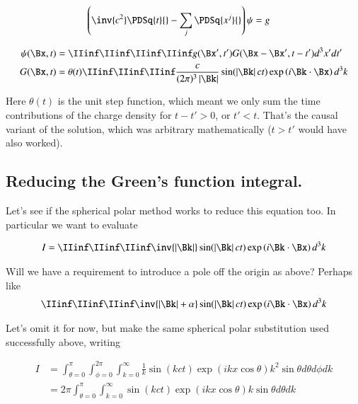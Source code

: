 \begin{align}
\left( \inv{c^2} \PDSq{t}{} -\sum_j \PDSq{x^j}{} \right)\psi &= g
\end{align}

\begin{align}
{\psi}(\Bx, t) &= \IIinf \IIinf \IIinf \IIinf g(\Bx', t') G(\Bx - \Bx', t - t') d^3 x' dt' \\
G(\Bx, t) &= \theta(t) \IIinf \IIinf \IIinf \frac{c}{(2\pi)^3 \Abs{\Bk}} \sin( \Abs{\Bk} c t ) \exp\left( i \Bk \cdot \Bx \right) d^3 k
\end{align}

Here $\theta(t)$ is the unit step function, which meant we only sum the time contributions of the charge density for $t - t' > 0$, or $t' < t$.  That's the causal variant of the solution, which was arbitrary mathematically ($t > t'$ would have also worked).

\subsection{Reducing the Green's function integral. }

Let's see if the spherical polar method works to reduce this equation too.  In particular we want to evaluate

\begin{align*}
I = \IIinf \IIinf \IIinf \inv{\Abs{\Bk}} \sin( \Abs{\Bk} c t ) \exp\left( i \Bk \cdot \Bx \right) d^3 k
\end{align*}

Will we have a requirement to introduce a pole off the origin as above?  Perhaps like
\begin{align*}
\IIinf \IIinf \IIinf \inv{\Abs{\Bk} + \alpha} \sin( \Abs{\Bk} c t ) \exp\left( i \Bk \cdot \Bx \right) d^3 k
\end{align*}

Let's omit it for now, but make the same spherical polar substitution used successfully above, writing

\begin{align*}
I
&= \int_{\theta=0}^{\pi} \int_{\phi=0}^{2\pi} \int_{k=0}^\infty \frac{1}{k }
\sin\left( k c t \right) \exp\left( i k x \cos\theta \right)
k^2 \sin\theta d\theta d\phi dk \\
&= 2 \pi \int_{\theta=0}^{\pi} \int_{k=0}^\infty %
\sin\left( k c t \right) \exp\left( i k x \cos\theta \right)
k \sin\theta d\theta dk \\
\end{align*}


